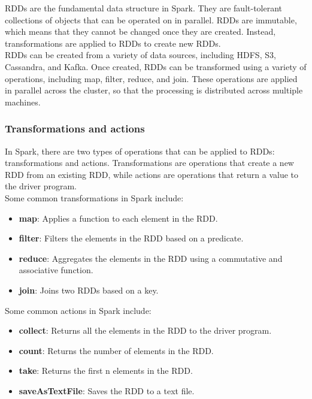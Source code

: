 RDDs are the fundamental data structure in Spark. They are fault-tolerant collections of objects that
can be operated on in parallel. RDDs are immutable, which means that they cannot be changed once they
are created. Instead, transformations are applied to RDDs to create new RDDs.\\

RDDs can be created from a variety of data sources, including HDFS, S3, Cassandra, and Kafka. Once
created, RDDs can be transformed using a variety of operations, including map, filter, reduce, and join.
These operations are applied in parallel across the cluster, so that the processing is distributed
across multiple machines.

\subsubsection{Transformations and actions}

In Spark, there are two types of operations that can be applied to RDDs: transformations and actions.
Transformations are operations that create a new RDD from an existing RDD, while actions are operations
that return a value to the driver program.\\

Some common transformations in Spark include:

\begin{itemize}
    \item \textbf{map}: Applies a function to each element in the RDD.
    \item \textbf{filter}: Filters the elements in the RDD based on a predicate.
    \item \textbf{reduce}: Aggregates the elements in the RDD using a commutative and associative function.
    \item \textbf{join}: Joins two RDDs based on a key.
\end{itemize}

Some common actions in Spark include:

\begin{itemize}
    \item \textbf{collect}: Returns all the elements in the RDD to the driver program.
    \item \textbf{count}: Returns the number of elements in the RDD.
    \item \textbf{take}: Returns the first n elements in the RDD.
    \item \textbf{saveAsTextFile}: Saves the RDD to a text file.
\end{itemize}


